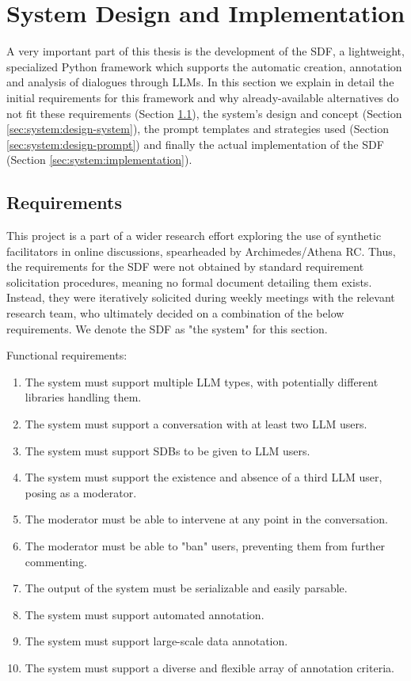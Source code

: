 %
\chapter{System Design and Implementation}
\label{sec:system}

A very important part of this thesis is the development of the \ac{SDF}, a lightweight, specialized Python framework which supports the automatic creation, annotation and analysis of dialogues through LLMs. In this section we explain in detail the initial requirements for this framework and why already-available alternatives do not fit these requirements (Section \ref{sec:system:requirements}), the system's design and concept (Section \ref{sec:system:design-system}), the prompt templates and strategies used (Section \ref{sec:system:design-prompt}) and finally the actual implementation of the \ac{SDF} (Section \ref{sec:system:implementation}).

\section{Requirements}
\label{sec:system:requirements}

This project is a part of a wider research effort exploring the use of synthetic facilitators in online discussions, spearheaded by Archimedes/Athena RC. Thus, the requirements for the \ac{SDF} were not obtained by standard requirement solicitation procedures, meaning no formal document detailing them exists. Instead, they were iteratively solicited during weekly meetings with the relevant research team, who ultimately decided on a combination of the below requirements. We denote the \ac{SDF} as "the system" for this section.

Functional requirements:
\begin{enumerate}
	\item The system must support multiple LLM types, with potentially different libraries handling them.
	\item The system must support a conversation with at least two LLM users.
	\item The system must support \acp{SDB} to be given to LLM users.
	\item The system must support the existence and absence of a third LLM user, posing as a moderator.
	\item The moderator must be able to intervene at any point in the conversation.
	\item The moderator must be able to "ban" users, preventing them from further commenting.
	\item The output of the system must be serializable and easily parsable.
	\item The system must support automated annotation.
	\item The system must support large-scale data annotation.
	\item The system must support a diverse and flexible array of annotation criteria.
\end{enumerate}

